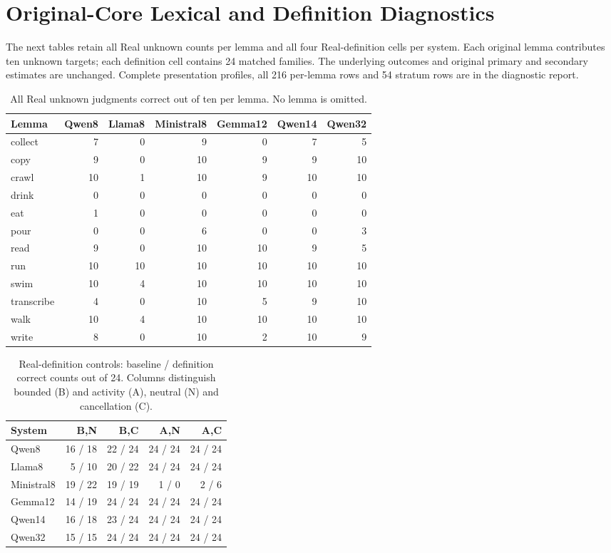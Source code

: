 \documentclass[acmlarge,anonymous,review,nonacm]{acmart}
\begin{document}
\section{Original-Core Lexical and Definition Diagnostics}
The next tables retain all Real unknown counts per lemma and all four Real-definition cells per system. Each original lemma contributes ten unknown targets; each definition cell contains 24 matched families. The underlying outcomes and original primary and secondary estimates are unchanged. Complete presentation profiles, all 216 per-lemma rows and 54 stratum rows are in the diagnostic report.

\begin{table}[H]
\centering
\small
\caption{All Real unknown judgments correct out of ten per lemma. No lemma is omitted.}
\label{tab:lemmas}
\setlength{\tabcolsep}{4pt}
\begin{tabular}{lrrrrrr}
\toprule
Lemma & Qwen8 & Llama8 & Ministral8 & Gemma12 & Qwen14 & Qwen32 \\
\midrule
collect & 7 & 0 & 9 & 0 & 7 & 5 \\
copy & 9 & 0 & 10 & 9 & 9 & 10 \\
crawl & 10 & 1 & 10 & 9 & 10 & 10 \\
drink & 0 & 0 & 0 & 0 & 0 & 0 \\
eat & 1 & 0 & 0 & 0 & 0 & 0 \\
pour & 0 & 0 & 6 & 0 & 0 & 3 \\
read & 9 & 0 & 10 & 10 & 9 & 5 \\
run & 10 & 10 & 10 & 10 & 10 & 10 \\
swim & 10 & 4 & 10 & 10 & 10 & 10 \\
transcribe & 4 & 0 & 10 & 5 & 9 & 10 \\
walk & 10 & 4 & 10 & 10 & 10 & 10 \\
write & 8 & 0 & 10 & 2 & 10 & 9 \\
\bottomrule
\end{tabular}
\end{table}
\begin{table}[H]
\centering
\small
\caption{Real-definition controls: baseline / definition correct counts out of 24. Columns distinguish bounded (B) and activity (A), neutral (N) and cancellation (C).}
\label{tab:definitions}
\setlength{\tabcolsep}{4pt}
\begin{tabular}{lrrrr}
\toprule
System & B,N & B,C & A,N & A,C \\
\midrule
Qwen8 & 16 / 18 & 22 / 24 & 24 / 24 & 24 / 24 \\
Llama8 & 5 / 10 & 20 / 22 & 24 / 24 & 24 / 24 \\
Ministral8 & 19 / 22 & 19 / 19 & 1 / 0 & 2 / 6 \\
Gemma12 & 14 / 19 & 24 / 24 & 24 / 24 & 24 / 24 \\
Qwen14 & 16 / 18 & 23 / 24 & 24 / 24 & 24 / 24 \\
Qwen32 & 15 / 15 & 24 / 24 & 24 / 24 & 24 / 24 \\
\bottomrule
\end{tabular}
\end{table}
\end{document}
